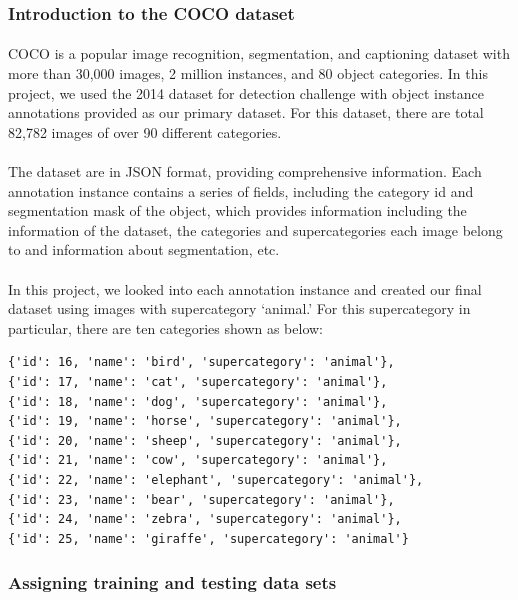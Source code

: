 \documentclass{article}
\begin{document}
\subsubsection{Introduction to the COCO dataset}
\paragraph{}
COCO is a popular image recognition, segmentation, and captioning dataset with more than 30,000 images, 2 million instances, and 80 object categories. In this project, we used the 2014 dataset for detection challenge with object instance annotations provided as our primary dataset. For this dataset, there are total 82,782 images of over 90 different categories.
\paragraph{}
The dataset are in JSON format, providing comprehensive information. Each annotation instance contains a series of fields, including the category id and segmentation mask of the object, which provides information including the information of the dataset, the categories and supercategories each image belong to and information about segmentation, etc.
\paragraph{}
In this project, we looked into each annotation instance and created our final dataset using images with supercategory ‘animal.’ For this supercategory in particular, there are ten categories shown as below:
 
\begin{verbatim}
{'id': 16, 'name': 'bird', 'supercategory': 'animal'},
{'id': 17, 'name': 'cat', 'supercategory': 'animal'},
{'id': 18, 'name': 'dog', 'supercategory': 'animal'},
{'id': 19, 'name': 'horse', 'supercategory': 'animal'},
{'id': 20, 'name': 'sheep', 'supercategory': 'animal'},
{'id': 21, 'name': 'cow', 'supercategory': 'animal'},
{'id': 22, 'name': 'elephant', 'supercategory': 'animal'},
{'id': 23, 'name': 'bear', 'supercategory': 'animal'},
{'id': 24, 'name': 'zebra', 'supercategory': 'animal'},
{'id': 25, 'name': 'giraffe', 'supercategory': 'animal'}
\end{verbatim}
 
\subsubsection{Assigning training and testing data sets}
\end{document}
